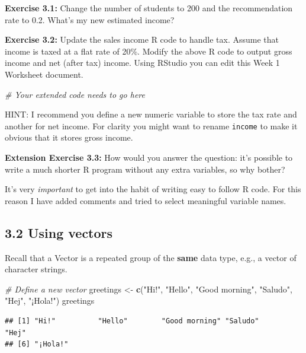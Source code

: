 \documentclass[
]{article}
\newenvironment{Shaded}{\begin{snugshade}}{\end{snugshade}}
\newcommand{\CommentTok}[1]{\textcolor[rgb]{0.56,0.35,0.01}{\textit{#1}}}
\newcommand{\FunctionTok}[1]{\textcolor[rgb]{0.13,0.29,0.53}{\textbf{#1}}}
\newcommand{\NormalTok}[1]{#1}
\newcommand{\OtherTok}[1]{\textcolor[rgb]{0.56,0.35,0.01}{#1}}
\newcommand{\StringTok}[1]{\textcolor[rgb]{0.31,0.60,0.02}{#1}}
\begin{document}
\textbf{Exercise 3.1:} Change the number of students to 200 and the
recommendation rate to 0.2. What's my new estimated income?

\textbf{Exercise 3.2:} Update the sales income R code to handle tax.
Assume that income is taxed at a flat rate of 20\%. Modify the above R
code to output gross income and net (after tax) income. Using RStudio
you can edit this Week 1 Worksheet document.

\begin{Shaded}
\begin{Highlighting}[]
\CommentTok{\# Your extended code needs to go here }
\end{Highlighting}
\end{Shaded}

HINT: I recommend you define a new numeric variable to store the tax
rate and another for net income. For clarity you might want to rename
\texttt{income} to make it obvious that it stores gross income.

\textbf{Extension Exercise 3.3:} How would you answer the question: it's
possible to write a much shorter R program without any extra variables,
so why bother?

It's very \emph{important} to get into the habit of writing easy to
follow R code. For this reason I have added comments and tried to select
meaningful variable names.

\subsection{3.2 Using vectors}\label{using-vectors}

Recall that a Vector is a repeated group of the \textbf{same} data type,
e.g., a vector of character strings.

\begin{Shaded}
\begin{Highlighting}[]
\CommentTok{\# Define a new vector}
\NormalTok{greetings }\OtherTok{\textless{}{-}} \FunctionTok{c}\NormalTok{(}\StringTok{"Hi!"}\NormalTok{, }\StringTok{"Hello"}\NormalTok{, }\StringTok{"Good morning"}\NormalTok{, }\StringTok{"Saludo"}\NormalTok{, }\StringTok{"Hej"}\NormalTok{, }\StringTok{"¡Hola!"}\NormalTok{)}
\NormalTok{greetings}
\end{Highlighting}
\end{Shaded}

\begin{verbatim}
## [1] "Hi!"          "Hello"        "Good morning" "Saludo"       "Hej"         
## [6] "¡Hola!"
\end{verbatim}
\end{document}
